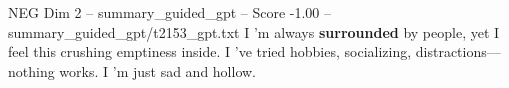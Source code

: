 \begin{textsample}{NEG Dim 2 – summary\_guided\_gpt – Score -1.00 – summary\_guided\_gpt/t2153\_gpt.txt}  \label{ex:f2_neg_035}
I ’m always \textbf{surrounded} by people, yet I feel this crushing emptiness inside.
I ’ve tried hobbies, socializing, distractions—nothing works.
I ’m just sad and hollow.

\end{textsample}
